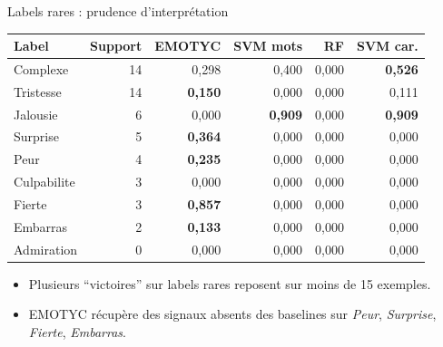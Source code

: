 \documentclass[aspectratio=169]{beamer}
\newcommand{\best}[1]{\textbf{\color{accent}#1}}
\begin{document}
\begin{frame}{Labels rares : prudence d'interprétation}
  \begin{center}
  \scriptsize
  \setlength{\tabcolsep}{5pt}
  \renewcommand{\arraystretch}{0.84}
  \begin{tabular}{lrrrrr}
    \toprule
    \textbf{Label} & \textbf{Support} & \textbf{EMOTYC} & \textbf{SVM mots} & \textbf{RF} & \textbf{SVM car.} \\
    \midrule
    Complexe & 14 & 0,298 & 0,400 & 0,000 & \best{0,526} \\
    Tristesse & 14 & \best{0,150} & 0,000 & 0,000 & 0,111 \\
    Jalousie & 6 & 0,000 & \best{0,909} & 0,000 & \best{0,909} \\
    Surprise & 5 & \best{0,364} & 0,000 & 0,000 & 0,000 \\
    Peur & 4 & \best{0,235} & 0,000 & 0,000 & 0,000 \\
    Culpabilite & 3 & 0,000 & 0,000 & 0,000 & 0,000 \\
    Fierte & 3 & \best{0,857} & 0,000 & 0,000 & 0,000 \\
    Embarras & 2 & \best{0,133} & 0,000 & 0,000 & 0,000 \\
    Admiration & 0 & 0,000 & 0,000 & 0,000 & 0,000 \\
    \bottomrule
  \end{tabular}
  \end{center}

  \vspace{-0.1cm}
  \begin{itemize}\footnotesize
    \item Plusieurs ``victoires'' sur labels rares reposent sur moins de 15 exemples.
    \item EMOTYC récupère des signaux absents des baselines sur \textit{Peur}, \textit{Surprise}, \textit{Fierte}, \textit{Embarras}.
  \end{itemize}
\end{frame}
\end{document}
